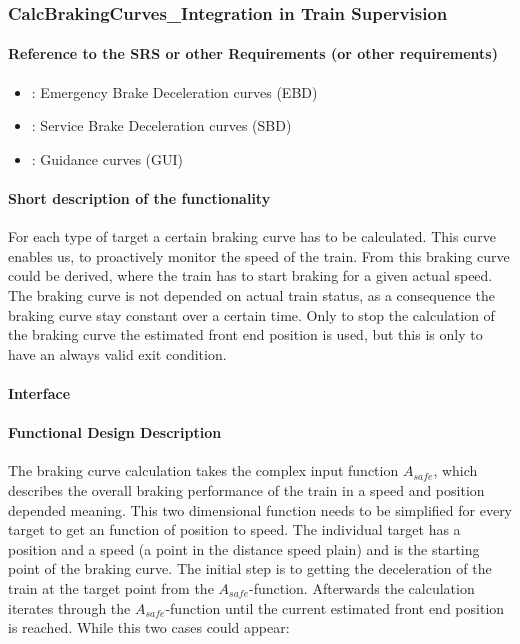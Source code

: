 \subsubsection{CalcBrakingCurves\_Integration in Train Supervision} 
\paragraph{Reference to the SRS or other Requirements (or other requirements)}
\begin{itemize}
	\item \cite[Chapt.~3.13.8.3]{subset-026}: Emergency Brake Deceleration curves (EBD)
	\item \cite[Chapt.~3.13.8.4]{subset-026}: Service Brake Deceleration curves (SBD)
	\item \cite[Chapt.~3.13.8.5]{subset-026}: Guidance curves (GUI)
\end{itemize}
\paragraph{Short description of the functionality}
For each type of target a certain braking curve has to be calculated. This curve enables us, to proactively monitor the speed of the train. From this braking curve could be derived, where the train has to start braking for a given actual speed. The braking curve is not depended on actual train status, as a consequence the braking curve stay constant over a certain time. Only to stop the calculation of the braking curve the estimated front end position is used, but this is only to have an always valid exit condition.
\paragraph{Interface}
\paragraph{Functional Design Description}
The braking curve calculation takes the complex input function $A_{safe}$, which describes the overall braking performance of the train in a speed and position depended meaning. This two dimensional function needs to be simplified for every target to get an function of position to speed. The individual target has a position and a speed (a point in the distance speed plain) and is the starting point of the braking curve. The initial step is to getting the deceleration of the train at the target point from the $A_{safe}$-function. Afterwards the calculation iterates through the $A_{safe}$-function until the current estimated front end position is reached. While this two cases could appear:

